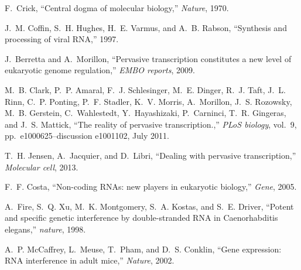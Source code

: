\documentclass[11pt, oneside]{Thesis} %
\providecommand{\DIFdelbegin}{} %
\providecommand{\DIFdelend}{} %
\begin{document}
\DIFdelend %

\backmatter

\DIFdelbegin %

\DIFdelend \label{Bibliography}





\begin{thebibliography}{100}

F.~Crick, ``{Central dogma of molecular biology},'' {\em Nature}, 1970.

J.~M. Coffin, S.~H. Hughes, H.~E. Varmus, and A.~B. Rabson, ``{Synthesis and
  processing of viral RNA},'' 1997.

J.~Berretta and A.~Morillon, ``{Pervasive transcription constitutes a new level
  of eukaryotic genome regulation},'' {\em EMBO reports}, 2009.

M.~B. Clark, P.~P. Amaral, F.~J. Schlesinger, M.~E. Dinger, R.~J. Taft, J.~L.
  Rinn, C.~P. Ponting, P.~F. Stadler, K.~V. Morris, A.~Morillon, J.~S.
  Rozowsky, M.~B. Gerstein, C.~Wahlestedt, Y.~Hayashizaki, P.~Carninci, T.~R.
  Gingeras, and J.~S. Mattick, ``{The reality of pervasive transcription.},''
  {\em PLoS biology}, vol.~9, pp.~e1000625--discussion e1001102, July 2011.

T.~H. Jensen, A.~Jacquier, and D.~Libri, ``{Dealing with pervasive
  transcription},'' {\em Molecular cell}, 2013.

F.~F. Costa, ``{Non-coding RNAs: new players in eukaryotic biology},'' {\em
  Gene}, 2005.

A.~Fire, S.~Q. Xu, M.~K. Montgomery, S.~A. Kostas, and S.~E. Driver, ``{Potent
  and specific genetic interference by double-stranded RNA in Caenorhabditis
  elegans},'' {\em nature}, 1998.

A.~P. McCaffrey, L.~Meuse, T.~Pham, and D.~S. Conklin, ``{Gene expression: RNA
  interference in adult mice},'' {\em Nature}, 2002.


\end{thebibliography}
\end{document}
